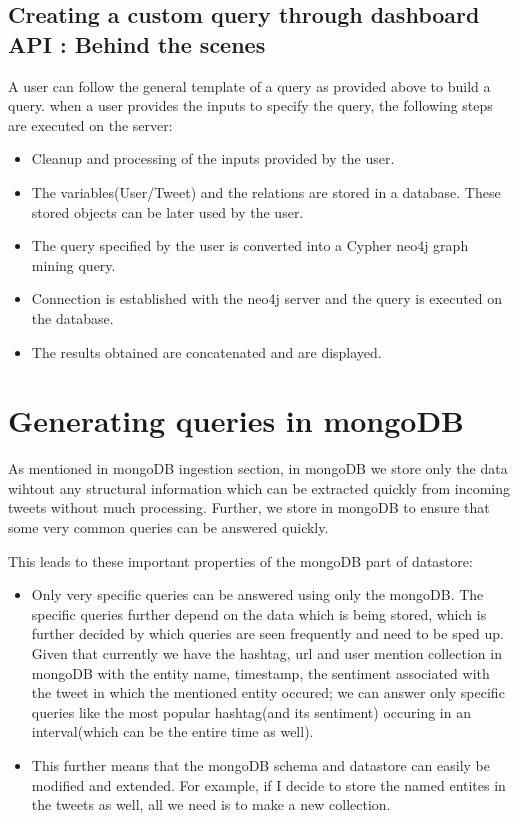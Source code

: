 \documentclass[letterpaper,10pt,english]{sphinxmanual}
\begin{document}
\section{Creating a custom query through dashboard API : Behind the scenes}
\label{\detokenize{neo4j_query_generation:creating-a-custom-query-through-dashboard-api-behind-the-scenes}}
A user can follow the general template of a query as provided above to build a query.
when a user provides the inputs to specify the query, the following steps are executed on the server:
\begin{itemize}
\item {} 
Cleanup and processing of the inputs provided by the user.

\item {} 
The variables(User/Tweet) and the relations are stored in a database. These stored objects can be later used by the user.

\item {} 
The query specified by the user is converted into a Cypher neo4j graph mining query.

\item {} 
Connection is established with the neo4j server and the query is executed on the database.

\item {} 
The results obtained are concatenated and are displayed.

\end{itemize}


\chapter{Generating queries in mongoDB}
\label{\detokenize{mongoDB_query_generation:generating-queries-in-mongodb}}\label{\detokenize{mongoDB_query_generation::doc}}
As mentioned in mongoDB ingestion section, in mongoDB we store only the data wihtout any structural information which can be extracted quickly from incoming tweets without much processing. Further, we store in mongoDB to ensure that some very common queries can be answered quickly.

This leads to these important properties of the mongoDB part of datastore:
\begin{itemize}
\item {} 
Only very specific queries can be answered using only the mongoDB. The specific queries further depend on the data which is being stored, which is further decided by which queries are seen frequently and need to be sped up. Given that currently we have the hashtag, url and user mention collection in mongoDB with the entity name, timestamp, the sentiment associated with the tweet in which the mentioned entity occured; we can answer only specific queries like the most popular hashtag(and its sentiment) occuring in an interval(which can be the entire time as well).

\item {} 
This further means that the mongoDB schema and datastore can easily be modified and extended. For example, if I decide to store the named entites in the tweets as well, all we need is to make a new collection.

\end{itemize}
\end{document}
